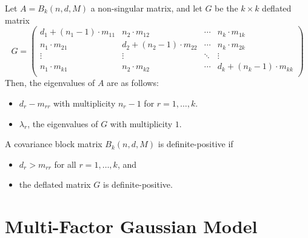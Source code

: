 \documentclass[11pt,fleqn]{book} %
\begin{document}
\begin{proposition}
	\label{prop1}
	Let $A = B_k(n, d, M)$ a non-singular matrix, and let $G$ be the $k {\times} k$ 
	deflated matrix
	\begin{displaymath}
		G =
		\left( \begin{array}{cccc}
		d_1+(n_1-1)\cdot m_{11} & n_2 \cdot m_{12}        & \cdots & n_k \cdot m_{1k} \\
		n_1\cdot m_{21}         & d_2+(n_2-1)\cdot m_{22} & \cdots & n_k \cdot m_{2k} \\
		\vdots                  & \vdots                  & \ddots & \vdots \\
		n_1\cdot m_{k1}         & n_2 \cdot m_{k2}        & \cdots & d_k+(n_k-1)\cdot m_{kk} \\
		\end{array} \right)
	\end{displaymath}
	Then, the eigenvalues of $A$ are as follows:
	\begin{itemize}
		\item $d_{r}-m_{rr}$ with multiplicity $n_r-1$ for $r=1,\dots,k$.
		\item $\lambda_r$, the eigenvalues of $G$ with multiplicity $1$.
	\end{itemize}
\end{proposition}

\begin{corollary}
	A covariance block matrix $B_k(n,d,M)$ is definite-positive if
	\begin{itemize}
		\item $d_r > m_{rr}$ for all $r=1,\dots,k$, and
		\item the deflated matrix $G$ is definite-positive.
	\end{itemize}
\end{corollary}

\section{Multi-Factor Gaussian Model}
\label{ap:mfgm}
\end{document}

